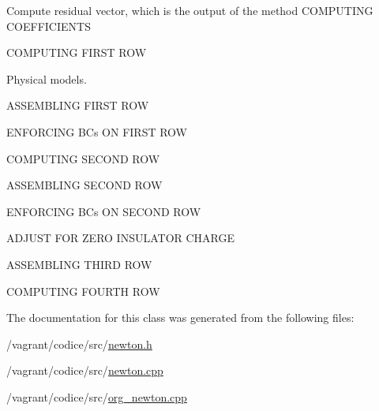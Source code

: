 Compute residual vector, which is the output of the method C\-O\-M\-P\-U\-T\-I\-N\-G C\-O\-E\-F\-F\-I\-C\-I\-E\-N\-T\-S

C\-O\-M\-P\-U\-T\-I\-N\-G F\-I\-R\-S\-T R\-O\-W

Physical models.

A\-S\-S\-E\-M\-B\-L\-I\-N\-G F\-I\-R\-S\-T R\-O\-W

E\-N\-F\-O\-R\-C\-I\-N\-G B\-Cs O\-N F\-I\-R\-S\-T R\-O\-W

C\-O\-M\-P\-U\-T\-I\-N\-G S\-E\-C\-O\-N\-D R\-O\-W

A\-S\-S\-E\-M\-B\-L\-I\-N\-G S\-E\-C\-O\-N\-D R\-O\-W

E\-N\-F\-O\-R\-C\-I\-N\-G B\-Cs O\-N S\-E\-C\-O\-N\-D R\-O\-W

A\-D\-J\-U\-S\-T F\-O\-R Z\-E\-R\-O I\-N\-S\-U\-L\-A\-T\-O\-R C\-H\-A\-R\-G\-E

A\-S\-S\-E\-M\-B\-L\-I\-N\-G T\-H\-I\-R\-D R\-O\-W

C\-O\-M\-P\-U\-T\-I\-N\-G F\-O\-U\-R\-T\-H R\-O\-W 

The documentation for this class was generated from the following files\-:\begin{DoxyCompactItemize}
\item 
/vagrant/codice/src/\hyperlink{newton_8h}{newton.\-h}\item 
/vagrant/codice/src/\hyperlink{newton_8cpp}{newton.\-cpp}\item 
/vagrant/codice/src/\hyperlink{org__newton_8cpp}{org\-\_\-newton.\-cpp}\end{DoxyCompactItemize}
